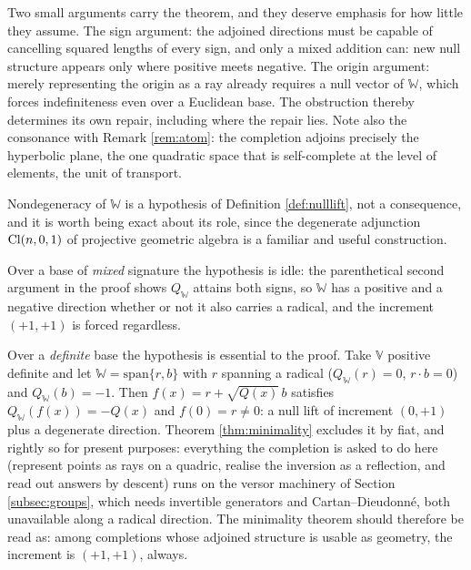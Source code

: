 \begin{remark}\label{rem:signargument}
Two small arguments carry the theorem, and they deserve emphasis for how little they assume. The sign argument: the adjoined directions must be capable of cancelling squared lengths of every sign, and only a mixed addition can: new null structure appears only where positive meets negative. The origin argument: merely representing the origin as a ray already requires a null vector of $\mathbb{W}$, which forces indefiniteness even over a Euclidean base. The obstruction thereby determines its own repair, including where the repair lies. Note also the consonance with Remark \ref{rem:atom}: the completion adjoins precisely the hyperbolic plane, the one quadratic space that is self-complete at the level of elements, the unit of transport.
\end{remark}

\begin{remark}\label{rem:degenerate}
Nondegeneracy of $\mathbb{W}$ is a hypothesis of Definition \ref{def:nulllift}, not a consequence, and it is worth being exact about its role, since the degenerate adjunction $\mathrm{Cl}(n,0,1)$ of projective geometric algebra is a familiar and useful construction.

Over a base of \emph{mixed} signature the hypothesis is idle: the parenthetical second argument in the proof shows $Q_{\mathbb{W}}$ attains both signs, so $\mathbb{W}$ has a positive and a negative direction whether or not it also carries a radical, and the increment $(+1,+1)$ is forced regardless.

Over a \emph{definite} base the hypothesis is essential to the proof. Take $\mathbb{V}$ positive definite and let $\mathbb{W} = \mathrm{span}\{r, b\}$ with $r$ spanning a radical ($Q_{\mathbb{W}}(r) = 0$, $r \cdot b = 0$) and $Q_{\mathbb{W}}(b) = -1$. Then $f(x) = r + \sqrt{Q(x)}\,b$ satisfies $Q_{\mathbb{W}}(f(x)) = -Q(x)$ and $f(0) = r \neq 0$: a null lift of increment $(0,+1)$ plus a degenerate direction. Theorem \ref{thm:minimality} excludes it by fiat, and rightly so for present purposes: everything the completion is asked to do here (represent points as rays on a quadric, realise the inversion as a reflection, and read out answers by descent) runs on the versor machinery of Section \ref{subsec:groups}, which needs invertible generators and Cartan--Dieudonn\'e, both unavailable along a radical direction. The minimality theorem should therefore be read as: among completions whose adjoined structure is usable as geometry, the increment is $(+1,+1)$, always.
\end{remark}

